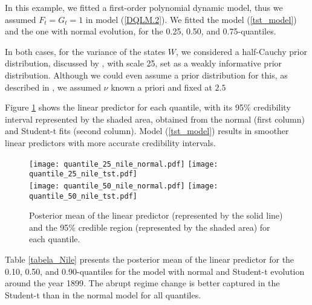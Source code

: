 \documentclass[12pt,a4paper]{article}\usepackage[]{graphicx}\usepackage[]{color}\usepackage{subfigure}
\begin{document}
In this example, we fitted a first-order polynomial dynamic model, thus we assumed $F_t=G_t=1$ in model (\ref{DQLM.2}). 
We fitted the model (\ref{tst_model}) and the one with normal evolution, for the 0.25, 0.50, and 0.75-quantiles.

In both cases, for the variance of the states $W$, we considered a half-Cauchy prior distribution, discussed by \cite{gelman2006prior}, with scale 25, set as a weakly informative prior distribution. 
Although we could even assume a prior distribution for this, as described in \cite{Petris2009dynamic}, we assumed 
$\nu$ known a priori and fixed at $2.5$

Figure \ref{Nile_normal} shows the linear predictor for each quantile, with its 95\% credibility interval represented by the shaded area, obtained from the normal (first column) and Student-t fits (second column). 
Model (\ref{tst_model}) results in smoother linear predictors with more accurate credibility intervals.

\clearpage


\begin{figure}[h!]
\begin{center}
{\texttt{[image: quantile\_25\_nile\_normal.pdf]}}\hspace{-0.3 cm} %
{\texttt{[image: quantile\_25\_nile\_tst.pdf]}}\\
{\texttt{[image: quantile\_50\_nile\_normal.pdf]}}\hspace{-0.3 cm}
{\texttt{[image: quantile\_50\_nile\_tst.pdf]}}\\
\hspace{-0.3 cm}
\end{center}
\vspace{-0.5 cm}\caption{Posterior mean of the linear predictor (represented by the solid line) and the 95\% credible region (represented by the shaded area) for each quantile.}\label{Nile_normal}
\end{figure}

 \clearpage
 
 Table \ref{tabela_Nile} presents the posterior mean of the linear predictor for the 0.10, 0.50, and 0.90-quantiles for the model with normal and Student-t evolution around the year 1899. The abrupt regime change is better captured in the Student-t than in the normal model for all quantiles.
\end{document}
